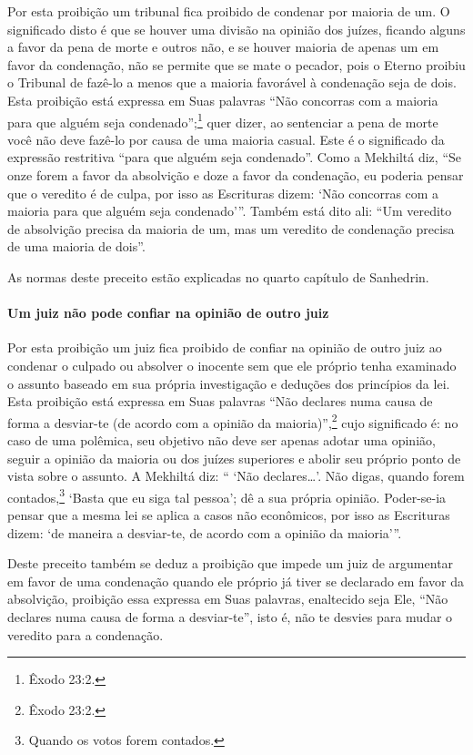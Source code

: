 Por esta proibição um tribunal fica proibido de condenar por maioria de
um. O significado disto é que se houver uma divisão na opinião dos
juízes, ficando alguns a favor da pena de morte e outros não, e se
houver maioria de apenas um em favor da condenação, não se permite que
se mate o pecador, pois o Eterno proibiu o Tribunal de fazê-lo a menos
que a maioria favorável à condenação seja de dois. Esta proibição está
expressa em Suas palavras ``Não concorras com a maioria para que alguém
seja condenado'';\footnote{Êxodo 23:2.} quer dizer, ao sentenciar a pena de morte
você não deve fazê-lo por causa de uma maioria casual. Este é o
significado da expressão restritiva ``para que alguém seja condenado''.
Como a Mekhiltá diz, ``Se onze forem a favor da absolvição e doze a
favor da condenação, eu poderia pensar que o veredito é de culpa, por
isso as Escrituras dizem: `Não concorras com a maioria para que alguém
seja condenado'''. Também está dito ali: ``Um veredito de absolvição
precisa da maioria de um, mas um veredito de condenação precisa de uma
maioria de dois''.

As normas deste preceito estão explicadas no quarto capítulo de Sanhedrin.

\paragraph{Um juiz não pode confiar na opinião de outro juiz}

Por esta proibição um juiz fica proibido de confiar na opinião de outro
juiz ao condenar o culpado ou absolver o inocente sem que ele próprio
tenha examinado o assunto baseado em sua própria investigação e deduções
dos princípios da lei. Esta proibição está expressa em Suas palavras
``Não declares numa causa de forma a desviar-te (de acordo com a
opinião da maioria)'',\footnote{Êxodo 23:2.} cujo significado é: no caso de uma
polêmica, seu objetivo não deve ser apenas adotar uma opinião, seguir a
opinião da maioria ou dos juízes superiores e abolir seu próprio ponto
de vista sobre o assunto. A Mekhiltá diz: `` `Não declares\ldots{}'. Não
digas, quando forem contados,\footnote{Quando os votos forem contados.} `Basta que eu siga tal pessoa'; dê a sua própria opinião. Poder-se-ia pensar que a mesma
lei se aplica a casos não econômicos, por isso as Escrituras dizem: `de
maneira a desviar-te, de acordo com a opinião da maioria'''.

Deste preceito também se deduz a proibição que impede um juiz de
argumentar em favor de uma condenação quando ele próprio já tiver se
declarado em favor da absolvição, proibição essa expressa em Suas
palavras, enaltecido seja Ele, ``Não declares numa causa de forma a
desviar-te'', isto é, não te desvies para mudar o veredito para a
condenação.


